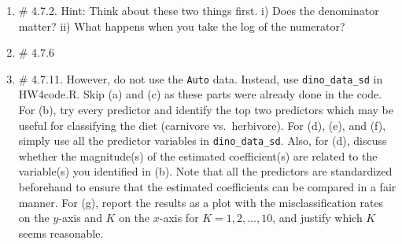 \documentclass[12pt]{article}
\begin{document}
\begin{enumerate}
\item \# 4.7.2. Hint: Think about these two things first. i) Does the denominator matter? ii) What happens when you take the log of the numerator? 

\item \# 4.7.6

\item \# 4.7.11. However, do not use the {\tt Auto} data. Instead, use {\tt dino\_data\_sd} in HW4code.R. Skip (a) and (c) as these parts were already done in the code. For (b), try every predictor and identify the top two predictors which may be useful for classifying the diet (carnivore vs.\ herbivore). For (d), (e), and (f), simply use all the predictor variables in {\tt dino\_data\_sd}. Also, for (d), discuss whether the magnitude(s) of the estimated coefficient(s) are related to the variable(s) you identified in (b). Note that all the predictors are standardized beforehand to ensure that the estimated coefficients can be compared in a fair manner. For (g), report the results as a plot with the misclassification rates on the $y$-axis and $K$ on the $x$-axis for $K = 1, 2, \ldots, 10$, and justify which $K$ seems reasonable.
\end{enumerate}
\end{document}
